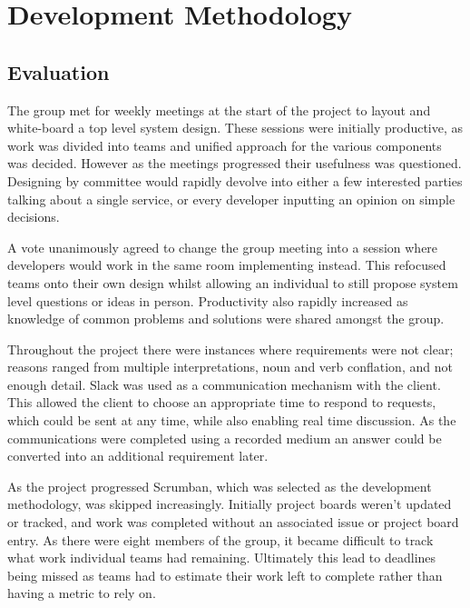 \section{Development Methodology}
\subsection{Evaluation}
\par
The group met for weekly meetings at the start of the project to layout and white-board a top level system design. These sessions were initially productive, as work was divided into teams and unified approach for the various components was decided. However as the meetings progressed their usefulness was questioned. Designing by committee would rapidly devolve into either a few interested parties talking about a single service, or every developer inputting an opinion on simple decisions.

\par
A vote unanimously agreed to change the group meeting into a session where developers would work in the same room implementing instead. This refocused teams onto their own design whilst allowing an individual to still propose system level questions or ideas in person. Productivity also rapidly increased as knowledge of common problems and solutions were shared amongst the group.

\par
Throughout the project there were instances where requirements were not clear; reasons ranged from multiple interpretations, noun and verb conflation, and not enough detail. Slack was used as a communication mechanism with the client. This allowed the client to choose an appropriate time to respond to requests, which could be sent at any time, while also enabling real time discussion. As the communications were completed using a recorded medium an answer could be converted into an additional requirement later.

\par
As the project progressed Scrumban, which was selected as the development methodology, was skipped increasingly. Initially project boards weren't updated or tracked, and work was completed without an associated issue or project board entry. As there were eight members of the group, it became difficult to track what work individual teams had remaining. Ultimately this lead to deadlines being missed as teams had to estimate their work left to complete rather than having a metric to rely on.

